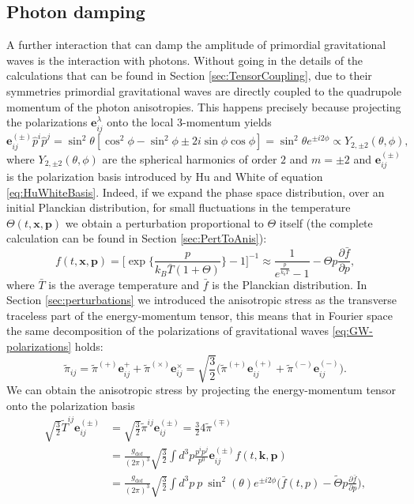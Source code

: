 \subsection{Photon damping}
\label{sec:photon_damping}
A further interaction that can damp the amplitude of primordial gravitational waves is the interaction with photons. Without going in the details of the calculations that can be found in Section \ref{sec:TensorCoupling}, due to their symmetries primordial gravitational waves are directly coupled to the quadrupole momentum of the photon anisotropies. This happens precisely because projecting the polarizations $\mathbf{e}_{ij}^\lambda$ onto the local 3-momentum yields
$$\mathbf{e}_{ij}^{(\pm)}\hat p^i\hat p^j=\sin^2\theta[\cos^2\phi-\sin^2\phi\pm2i\sin\phi\cos\phi]=\sin^2\theta e^{\pm i2\phi}\propto Y_{2,\pm2}(\theta,\phi),$$
where $Y_{2,\pm2}(\theta,\phi)$ are the spherical harmonics of order $2$ and $m=\pm2$ and $\mathbf{e}_{ij}^{(\pm)}$ is the polarization basis introduced by Hu and White \cite{HuWhite} of equation \eqref{eq:HuWhiteBasis}. Indeed, if we expand the phase space distribution, over an initial Planckian distribution, for small fluctuations in the temperature $\Theta(t,\mathbf x,\mathbf p)$ we obtain a perturbation proportional to $\Theta$ itself (the complete calculation can be found in Section \ref{sec:PertToAnis}):
$$
f(t,\mathbf x,\mathbf p)=\bigg[\exp\bigg\{\frac{p}{k_B\bar T(1+\Theta)}\bigg\}-1\bigg]^{-1}\approx \frac{1}{e^{\frac{p}{k_b\bar T}}-1}-\Theta p\frac{\partial \bar f}{\partial p},
$$ 
where $\bar T$ is the average temperature and $\bar f$ is the Planckian distribution. In Section \ref{sec:perturbations} we introduced the anisotropic stress as the transverse traceless part of the energy-momentum tensor, this means that in Fourier space the same decomposition of the polarizations of gravitational waves \eqref{eq:GW-polarizations} holds:
$$\tilde \pi_{ij}=\tilde\pi^{(+)}\boldsymbol e_{ij}^++\tilde\pi^{(\times)}\boldsymbol e_{ij}^\times=\sqrt{\frac{3}{2}} \big(\tilde\pi^{(+)}\mathbf{e}^{(+)}_{ij}+\tilde\pi^{(-)}\mathbf{e}^{(-)}_{ij}\big).$$
We can obtain the anisotropic stress by projecting the energy-momentum tensor onto the polarization basis
\begin{align*}
    \sqrt{\frac32}\tilde T^{ij}\boldsymbol{e}_{ij}^{(\pm)}&=\sqrt{\frac32}\tilde \pi^{ij}\boldsymbol{e}_{ij}^{(\pm)}=\frac{3}{2}4\tilde\pi^{(\mp)}\\
    &=\frac{g_\text{dof}}{(2\pi)^3}\sqrt{\frac32}\int d^3p \frac{p^ip^j}{p^0}\boldsymbol{e}_{ij}^{(\pm)}f(t,\mathbf k,\mathbf p)\\&=\frac{g_\text{dof}}{(2\pi)^3}\sqrt{\frac32}\int d^3p\ p\ \sin^2(\theta)e^{\pm i2\phi}\bigg(\bar f(t,p)-\tilde\Theta p\frac{\partial\bar f}{\partial p}\bigg),
\end{align*}
